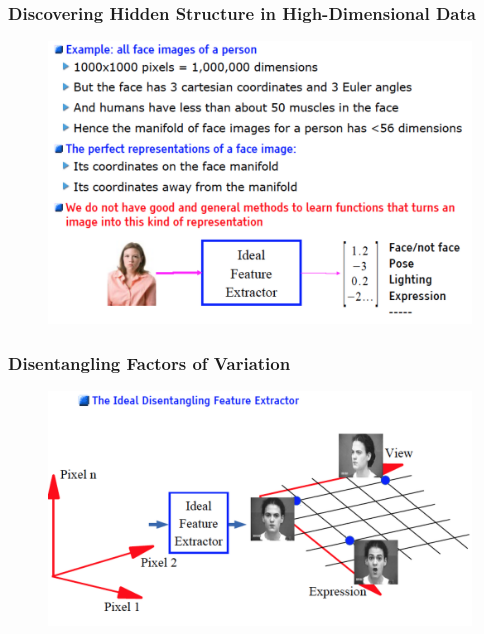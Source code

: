 \documentclass{beamer}
\begin{document}
\begin{frame}
\frametitle{Discovering Hidden Structure in High-Dimensional Data}
\begin{figure}
      \includegraphics[width=1\textwidth]{figs/intro13.png}
\end{figure}
\end{frame}

\begin{frame}
\frametitle{Disentangling Factors of Variation}
\begin{figure}
      \includegraphics[width=1\textwidth]{figs/intro14.png}
\end{figure}
\end{frame}
\end{document}
